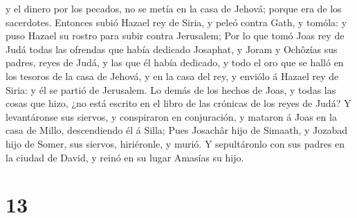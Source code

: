 y el dinero por los pecados, no se metía en la casa de Jehová; porque
era de los sacerdotes.  Entonces subió Hazael rey de Siria,
y peleó contra Gath, y tomóla: y puso Hazael su rostro para subir contra
Jerusalem;  Por lo que tomó Joas rey de Judá todas las
ofrendas que había dedicado Josaphat, y Joram y Ochôzías sus padres,
reyes de Judá, y las que él había dedicado, y todo el oro que se halló
en los tesoros de la casa de Jehová, y en la casa del rey, y enviólo á
Hazael rey de Siria: y él se partió de Jerusalem.  Lo demás
de los hechos de Joas, y todas las cosas que hizo, ¿no está escrito en
el libro de las crónicas de los reyes de Judá?  Y
levantáronse sus siervos, y conspiraron en conjuración, y mataron á Joas
en la casa de Millo, descendiendo él á Silla;  Pues
Josachâr hijo de Simaath, y Jozabad hijo de Somer, sus siervos,
hiriéronle, y murió. Y sepultáronlo con sus padres en la ciudad de
David, y reinó en su lugar Amasías su hijo.

\hypertarget{section-12}{%
\section{13}\label{section-12}}

